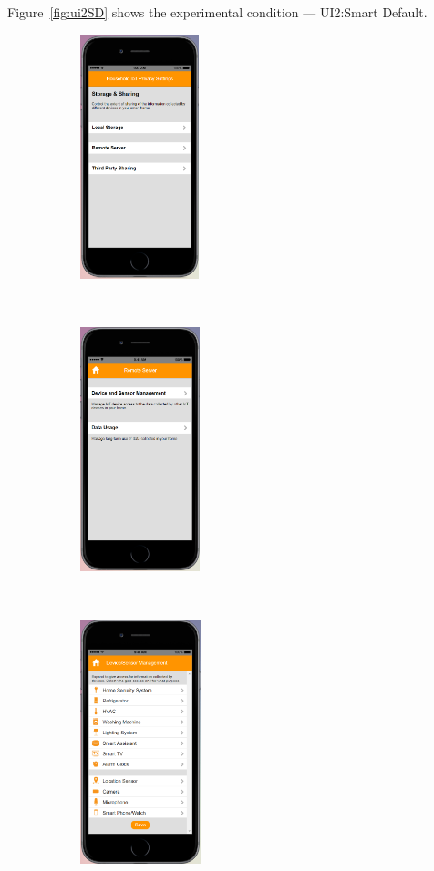\begin{appendices}
Figure~\ref{fig:ui2SD} shows the experimental condition --- UI2:Smart Default.
\begin{figure}
	\centering
	\begin{subfigure}[t]{0.2\textwidth}
		\centering
		\includegraphics[height=2.8in]{figures/ui2sd1.png}
	\end{subfigure}%
	~~~~~
	\begin{subfigure}[t]{0.2\textwidth}
		\centering
		\includegraphics[height=2.8in]{figures/ui2sd2.png}
	\end{subfigure}%
	~~~~~
	\begin{subfigure}[t]{0.2\textwidth}
		\centering
		\includegraphics[height=2.8in]{figures/ui2sd3.png}

\end{subfigure}
\end{figure}
\end{appendices}
